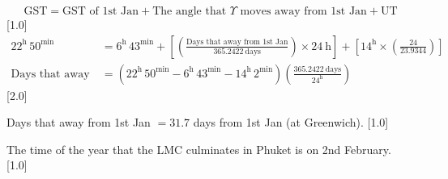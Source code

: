 \[ \mathrm{GST} = \text{GST of 1st Jan}
   + \text{The angle that $\Upsilon$ moves away from 1st Jan}
   + \mathrm{UT} \]
\hfill[1.0]
\begin{align*}
22^{\mathrm{h}}\,50^{\mathrm{min}}
  &= 6^{\mathrm{h}}\,43^{\mathrm{min}}
   + \left[\left(\frac{\text{Days that away from 1st Jan}}
                     {365.2422\ \text{days}}\right)\times 24\ \mathrm{h}\right]
   + \left[14^{\mathrm{h}}\times\left(\frac{24}{23.9344}\right)\right]\\
\text{Days that away from 1st Jan}
  &= (22^{\mathrm{h}}\,50^{\mathrm{min}} - 6^{\mathrm{h}}\,43^{\mathrm{min}}
    - 14^{\mathrm{h}}\,2^{\mathrm{min}})
    \left(\frac{365.2422\ \text{days}}{24^{\mathrm{h}}}\right)
\end{align*}
\hfill[2.0]

Days that away from 1st Jan $= 31.7$ days from 1st Jan (at Greenwich).
\hfill[1.0]

The time of the year that the LMC culminates in Phuket is on 2nd February.
\hfill[1.0]

